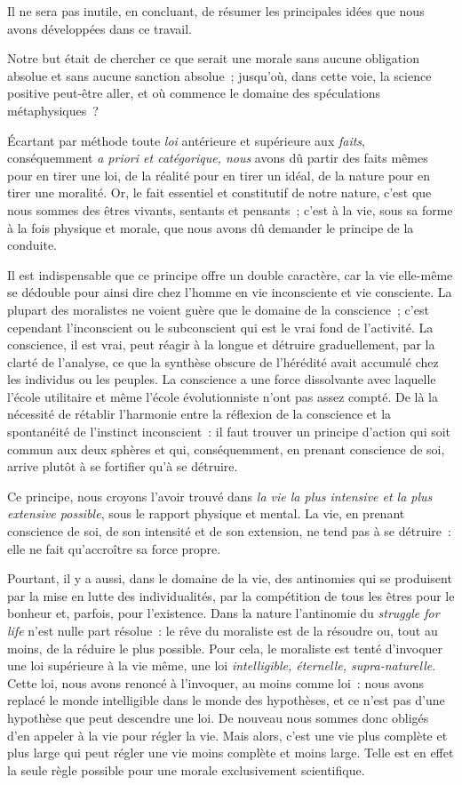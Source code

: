 \documentclass[french,twoside]{book} %
\begin{document}
\noindent Il ne sera pas inutile, en concluant, de résumer les principales idées que nous avons développées dans ce travail.\par
Notre but était de chercher ce que serait une morale sans aucune obligation absolue et sans aucune sanction absolue ; jusqu’où, dans cette voie, la science positive peut-être aller, et où commence le domaine des spéculations métaphysiques ?\par
Écartant par méthode toute \emph{loi} antérieure et supérieure aux \emph{faits}, conséquemment \emph{a priori et catégorique, nous} avons dû partir des faits mêmes pour en tirer une loi, de la réalité pour en tirer un idéal, de la nature pour en tirer une moralité. Or, le fait essentiel et constitutif de notre nature, c’est que nous sommes des êtres vivants, sentants et pensants ; c’est à la vie, sous sa forme à la fois physique et morale, que nous avons dû demander le principe de la conduite.\par
Il est indispensable que ce principe offre un double caractère, car la vie elle-même se dédouble pour ainsi dire chez l’homme en vie inconsciente et vie consciente. La plupart des moralistes ne voient guère que le domaine de la conscience ; c’est cependant l’inconscient ou le subconscient qui est le vrai fond de l’activité. La conscience, il est vrai, peut réagir à la longue et détruire graduellement, par la clarté de l’analyse, ce que la synthèse obscure de l’hérédité avait accumulé chez les individus ou les peuples. La conscience a une force dissolvante avec laquelle l’école utilitaire et même l’école évolutionniste n’ont pas assez compté. De là la nécessité de rétablir l’harmonie entre la réflexion de la conscience et la spontanéité de l’instinct inconscient : il faut trouver un principe d’action qui soit commun aux deux sphères et qui, conséquemment, en prenant conscience de soi, arrive plutôt à se fortifier qu’à se détruire.\par
Ce principe, nous croyons l’avoir trouvé dans \emph{la vie la plus intensive et la plus extensive possible}, sous le rapport physique et mental. La vie, en prenant conscience de soi, de son intensité et de son extension, ne tend pas à se détruire : elle ne fait qu’accroître sa force propre.\par
Pourtant, il y a aussi, dans le domaine de la vie, des antinomies qui se produisent par la mise en lutte des individualités, par la compétition de tous les êtres pour le bonheur et, parfois, pour l’existence. Dans la nature l’antinomie du \emph{struggle for life} n’est nulle part résolue : le rêve du moraliste est de la résoudre ou, tout au moins, de la réduire le plus possible. Pour cela, le moraliste est tenté d’invoquer une loi supérieure à la vie même, une loi \emph{intelligible, éternelle, supra-naturelle}. Cette loi, nous avons renoncé à l’invoquer, au moins comme loi : nous avons replacé le monde intelligible dans le monde des hypothèses, et ce n’est pas d’une hypothèse que peut descendre une loi. De nouveau nous sommes donc obligés d’en appeler à la vie pour régler la vie. Mais alors, c’est une vie plus complète et plus large qui peut régler une vie moins complète et moins large. Telle est en effet la seule règle possible pour une morale exclusivement scientifique.\par
\end{document}
